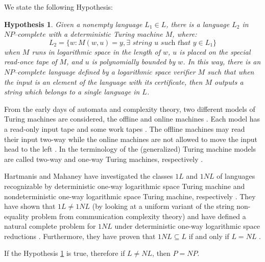 \documentclass[a4paper,UKenglish,cleveref, autoref]{lipics-v2019}
\newtheorem{hypothesis}[theorem]{Hypothesis}
\begin{document}
We state the following Hypothesis:

\begin{hypothesis}
\label{hypothesis1}
Given a nonempty language $L_{1} \in L$, there is a language $L_{2}$ in $\textit{NP--complete}$ with a deterministic Turing machine $M$, where:
\[L_{2} = \{w: M(w, u) = y, \exists \textit{ string } u \textit{ such that } y \in L_{1}\}\]
when $M$ runs in logarithmic space in the length of $w$, $u$ is placed on the special read-once tape of $M$, and $u$ is polynomially bounded by $w$. In this way, there is an $\textit{NP--complete}$ language defined by a logarithmic space verifier $M$ such that when the input is an element of the language with its certificate, then $M$ outputs a string which belongs to a single language in $L$.
\end{hypothesis}

From the early days of automata and complexity theory,  two  different  models  of  Turing  machines  are  considered, the offline and online machines \cite{KU15}. Each model has a read-only input tape and some work tapes \cite{KU15}. The offline machines may read their input two-way while the online machines are not allowed to move the input head to the left \cite{KU15}. In the terminology of the (generalized) Turing machine models are called two-way and one-way Turing machines, respectively \cite{KU15}.

Hartmanis and Mahaney have investigated the classes $1L$ and $1NL$ of languages recognizable by deterministic one-way logarithmic space Turing machine and nondeterministic one-way logarithmic space Turing machine, respectively \cite{HM81}. They have shown that $1L \neq 1NL$ (by looking at a uniform variant of the string non-equality problem from communication complexity theory) and have defined a natural complete problem for $1NL$ under deterministic one-way logarithmic space reductions \cite{HM81}. Furthermore, they have proven that $1NL \subseteq L$ if and only if $L=NL$ \cite{HM81}.

\begin{theorem}
\label{neg-implication}
If the Hypothesis \ref{hypothesis1} is true, therefore if $L \neq NL$, then $P = NP$.
\end{theorem}
\end{document}
